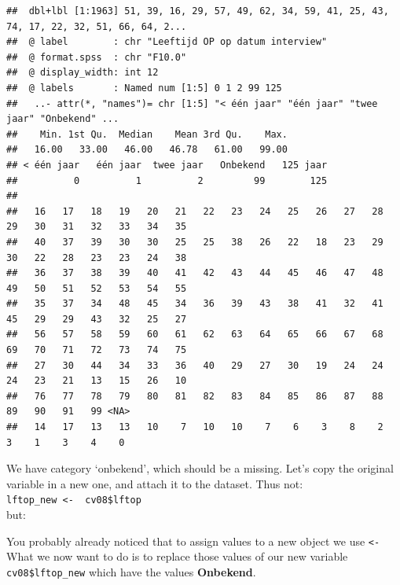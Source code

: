 \documentclass[
]{book}
\newenvironment{Shaded}{\begin{snugshade}}{\end{snugshade}}
\newcommand{\NormalTok}[1]{#1}
\newcommand{\OperatorTok}[1]{\textcolor[rgb]{0.81,0.36,0.00}{\textbf{#1}}}
\newcommand{\OtherTok}[1]{\textcolor[rgb]{0.56,0.35,0.01}{#1}}
\newcommand{\StringTok}[1]{\textcolor[rgb]{0.31,0.60,0.02}{#1}}
\begin{document}
\begin{verbatim}
##  dbl+lbl [1:1963] 51, 39, 16, 29, 57, 49, 62, 34, 59, 41, 25, 43, 74, 17, 22, 32, 51, 66, 64, 2...
##  @ label        : chr "Leeftijd OP op datum interview"
##  @ format.spss  : chr "F10.0"
##  @ display_width: int 12
##  @ labels       : Named num [1:5] 0 1 2 99 125
##   ..- attr(*, "names")= chr [1:5] "< één jaar" "één jaar" "twee jaar" "Onbekend" ...
##    Min. 1st Qu.  Median    Mean 3rd Qu.    Max. 
##   16.00   33.00   46.00   46.78   61.00   99.00 
## < één jaar   één jaar  twee jaar   Onbekend   125 jaar 
##          0          1          2         99        125 
## 
##   16   17   18   19   20   21   22   23   24   25   26   27   28   29   30   31   32   33   34   35 
##   40   37   39   30   30   25   25   38   26   22   18   23   29   30   22   28   23   23   24   38 
##   36   37   38   39   40   41   42   43   44   45   46   47   48   49   50   51   52   53   54   55 
##   35   37   34   48   45   34   36   39   43   38   41   32   41   45   29   29   43   32   25   27 
##   56   57   58   59   60   61   62   63   64   65   66   67   68   69   70   71   72   73   74   75 
##   27   30   44   34   33   36   40   29   27   30   19   24   24   24   23   21   13   15   26   10 
##   76   77   78   79   80   81   82   83   84   85   86   87   88   89   90   91   99 <NA> 
##   14   17   13   13   10    7   10   10    7    6    3    8    2    3    1    3    4    0
\end{verbatim}

We have category `onbekend', which should be a missing. Let's copy the original variable in a new one, and attach it to the dataset. Thus not:\\
\texttt{lftop\_new\ \textless{}-\ \ cv08\$lftop}~\\
but:

\begin{Shaded}
\end{Shaded}

You probably already noticed that to assign values to a new object we use \texttt{\textless{}-} What we now want to do is to replace those values of our new variable \texttt{cv08\$lftop\_new} which have the values \textbf{Onbekend}.

\begin{Shaded}
\end{Shaded}
\end{document}
